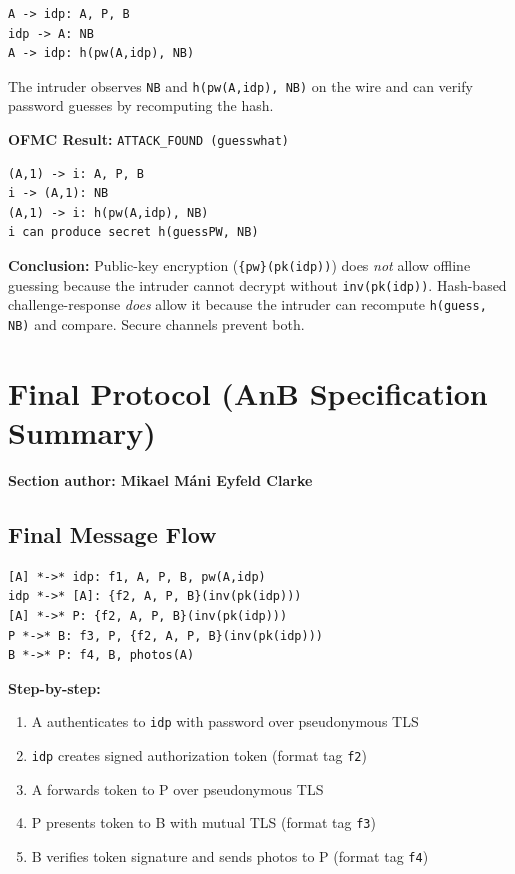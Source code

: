 \documentclass[11pt,a4paper]{article}
\newcommand{\sectionauthor}[1]{\noindent\textbf{Section author: #1}\par\medskip}
\begin{document}
\begin{lstlisting}[style=anb,caption={Insecure version: hash-based challenge-response}]
A -> idp: A, P, B
idp -> A: NB
A -> idp: h(pw(A,idp), NB)
\end{lstlisting}

The intruder observes \texttt{NB} and \texttt{h(pw(A,idp), NB)} on the wire and can
verify password guesses by recomputing the hash.

\textbf{OFMC Result:} \texttt{ATTACK\_FOUND (guesswhat)}
\begin{lstlisting}[style=terminal,caption={Guessing attack trace}]
(A,1) -> i: A, P, B
i -> (A,1): NB
(A,1) -> i: h(pw(A,idp), NB)
i can produce secret h(guessPW, NB)
\end{lstlisting}

\textbf{Conclusion:} Public-key encryption (\texttt{\{pw\}(pk(idp))}) does \emph{not} allow
offline guessing because the intruder cannot decrypt without \texttt{inv(pk(idp))}.
Hash-based challenge-response \emph{does} allow it because the intruder can recompute
\texttt{h(guess, NB)} and compare. Secure channels prevent both.

\section{Final Protocol (AnB Specification Summary)}
\sectionauthor{Mikael Máni Eyfeld Clarke}

\subsection{Final Message Flow}
\begin{lstlisting}[style=anb,caption={Final protocol (photo\_auth\_final.AnB)}]
[A] *->* idp: f1, A, P, B, pw(A,idp)
idp *->* [A]: {f2, A, P, B}(inv(pk(idp)))
[A] *->* P: {f2, A, P, B}(inv(pk(idp)))
P *->* B: f3, P, {f2, A, P, B}(inv(pk(idp)))
B *->* P: f4, B, photos(A)
\end{lstlisting}

\textbf{Step-by-step:}
\begin{enumerate}
  \item A authenticates to \texttt{idp} with password over pseudonymous TLS
  \item \texttt{idp} creates signed authorization token (format tag \texttt{f2})
  \item A forwards token to P over pseudonymous TLS
  \item P presents token to B with mutual TLS (format tag \texttt{f3})
  \item B verifies token signature and sends photos to P (format tag \texttt{f4})
\end{enumerate}
\end{document}
